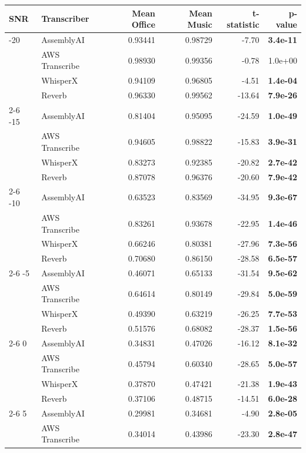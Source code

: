\begin{tabular}{llrrrr}
\toprule
SNR & Transcriber & Mean Office & Mean Music & t-statistic & p-value \\
\midrule
-20 & AssemblyAI & 0.93441 & 0.98729 & -7.70 & \textbf{ 3.4e-11} \\
  & AWS Transcribe & 0.98930 & 0.99356 & -0.78 &  1.0e+00 \\
  & WhisperX & 0.94109 & 0.96805 & -4.51 & \textbf{ 1.4e-04} \\
  & Reverb & 0.96330 & 0.99562 & -13.64 & \textbf{ 7.9e-26} \\
\cmidrule(r){2-6}
-15 & AssemblyAI & 0.81404 & 0.95095 & -24.59 & \textbf{ 1.0e-49} \\
  & AWS Transcribe & 0.94605 & 0.98822 & -15.83 & \textbf{ 3.9e-31} \\
  & WhisperX & 0.83273 & 0.92385 & -20.82 & \textbf{ 2.7e-42} \\
  & Reverb & 0.87078 & 0.96376 & -20.60 & \textbf{ 7.9e-42} \\
\cmidrule(r){2-6}
-10 & AssemblyAI & 0.63523 & 0.83569 & -34.95 & \textbf{ 9.3e-67} \\
  & AWS Transcribe & 0.83261 & 0.93678 & -22.95 & \textbf{ 1.4e-46} \\
  & WhisperX & 0.66246 & 0.80381 & -27.96 & \textbf{ 7.3e-56} \\
  & Reverb & 0.70680 & 0.86150 & -28.58 & \textbf{ 6.5e-57} \\
\cmidrule(r){2-6}
-5 & AssemblyAI & 0.46071 & 0.65133 & -31.54 & \textbf{ 9.5e-62} \\
  & AWS Transcribe & 0.64614 & 0.80149 & -29.84 & \textbf{ 5.0e-59} \\
  & WhisperX & 0.49390 & 0.63219 & -26.25 & \textbf{ 7.7e-53} \\
  & Reverb & 0.51576 & 0.68082 & -28.37 & \textbf{ 1.5e-56} \\
\cmidrule(r){2-6}
0 & AssemblyAI & 0.34831 & 0.47026 & -16.12 & \textbf{ 8.1e-32} \\
  & AWS Transcribe & 0.45794 & 0.60340 & -28.65 & \textbf{ 5.0e-57} \\
  & WhisperX & 0.37870 & 0.47421 & -21.38 & \textbf{ 1.9e-43} \\
  & Reverb & 0.37106 & 0.48715 & -14.51 & \textbf{ 6.0e-28} \\
\cmidrule(r){2-6}
5 & AssemblyAI & 0.29981 & 0.34681 & -4.90 & \textbf{ 2.8e-05} \\
  & AWS Transcribe & 0.34014 & 0.43986 & -23.30 & \textbf{ 2.8e-47} \\

\end{tabular}

